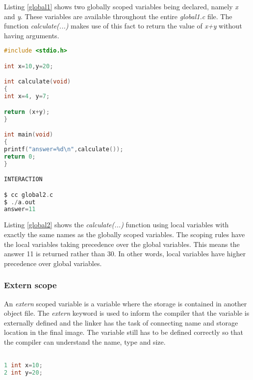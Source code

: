 Listing \ref{global1} shows two globally scoped variables being declared, namely \textit{x} and \textit{y}. These variables are available throughout the entire \textit{global1.c} file. The function \textit{calculate(...)} makes use of this fact to return the value of \textit{x+y} without having arguments.\\

\newpage

\begin{lstlisting}[language=C,caption={File global2.c, local scope},captionpos=b,label=global2]
#include <stdio.h>

int x=10,y=20;

int calculate(void)
{
int x=4, y=7;

return (x+y);
}

int main(void)
{
printf("answer=%d\n",calculate());
return 0;
}

INTERACTION

$ cc global2.c
$ ./a.out
answer=11
\end{lstlisting}

Listing \ref{global2} shows the \textit{calculate(...)}  function using local variables with exactly the same names as the globally scoped variables. The scoping rules have the local variables taking precedence over the global variables. This means the answer 11 is returned rather than 30. In other words, local variables have higher precedence over global variables.

\subsubsection{Extern scope}


An \textit{extern} scoped variable is a variable where the storage is contained in another object file. The \textit{extern} keyword is used to inform the compiler that the variable is externally defined and the linker has the task of connecting name and storage location in the final image. The variable still has to be defined correctly so that the compiler can understand the name, type and size.

\begin{lstlisting}[language=C,caption={File variables.c, only contains two variables},captionpos=b,label=variables]

1 int x=10;
2 int y=20;
 
\end{lstlisting}

